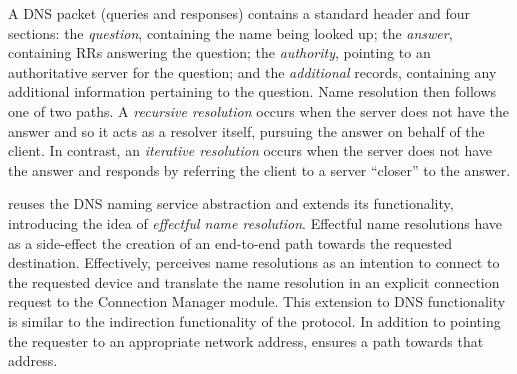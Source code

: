 A DNS packet (queries and responses)  contains a standard header and four
sections: the \emph{question}, containing the name being looked up; the
\emph{answer}, containing RRs answering the question; the \emph{authority},
pointing to an authoritative server for the question; and the \emph{additional}
records, containing any additional information pertaining to the question. Name
resolution then follows one of two paths. A \emph{recursive resolution} occurs
when the server does not have the answer and so it acts as a resolver itself,
pursuing the answer on behalf of the client. In contrast, an \emph{iterative
  resolution} occurs when the server does not have the answer and responds by
referring the client to a server ``closer'' to the answer.

\signpost reuses the DNS naming service abstraction and extends its
functionality, introducing the idea of \textit{effectful name resolution}.
Effectful name resolutions have as a side-effect  the creation of an end-to-end
path towards the requested destination.  Effectively, \signpost perceives name
resolutions as an intention to connect to the requested device and translate the
name resolution in an explicit connection request to the Connection Manager
module. This extension to DNS functionality is similar to the indirection
functionality of the protocol. In addition to pointing the requester to an
appropriate network address, \signpost ensures a path towards that address. 



